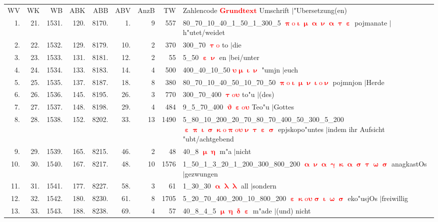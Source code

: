 \documentclass[a4paper,10pt,landscape]{article}
\begin{document}
\begin{tabular}{rrrrrrrrp{120mm}}
WV&WK&WB&ABK&ABB&ABV&AnzB&TW&Zahlencode \textcolor{red}{$\boldsymbol{Grundtext}$} Umschrift $|$"Ubersetzung(en)\\
1.&21.&1531.&120.&8170.&1.&9&557&80\_70\_10\_40\_1\_50\_1\_300\_5 \textcolor{red}{$\boldsymbol{\uppi\mathrm{o}\upiota\upmu\upalpha\upnu\upalpha\uptau\upepsilon}$} pojmanate $|$h"utet/weidet\\
2.&22.&1532.&129.&8179.&10.&2&370&300\_70 \textcolor{red}{$\boldsymbol{\uptau\mathrm{o}}$} to $|$die\\
3.&23.&1533.&131.&8181.&12.&2&55&5\_50 \textcolor{red}{$\boldsymbol{\upepsilon\upnu}$} en $|$bei/unter\\
4.&24.&1534.&133.&8183.&14.&4&500&400\_40\_10\_50 \textcolor{red}{$\boldsymbol{\upsilon\upmu\upiota\upnu}$} "umjn $|$euch\\
5.&25.&1535.&137.&8187.&18.&8&380&80\_70\_10\_40\_50\_10\_70\_50 \textcolor{red}{$\boldsymbol{\uppi\mathrm{o}\upiota\upmu\upnu\upiota\mathrm{o}\upnu}$} pojmnjon $|$Herde\\
6.&26.&1536.&145.&8195.&26.&3&770&300\_70\_400 \textcolor{red}{$\boldsymbol{\uptau\mathrm{o}\upsilon}$} to"u $|$(des)\\
7.&27.&1537.&148.&8198.&29.&4&484&9\_5\_70\_400 \textcolor{red}{$\boldsymbol{\upvartheta\upepsilon\mathrm{o}\upsilon}$} Teo"u $|$Gottes\\
8.&28.&1538.&152.&8202.&33.&13&1490&5\_80\_10\_200\_20\_70\_80\_70\_400\_50\_300\_5\_200 \textcolor{red}{$\boldsymbol{\upepsilon\uppi\upiota\upsigma\upkappa\mathrm{o}\uppi\mathrm{o}\upsilon\upnu\uptau\upepsilon\upsigma}$} epjskopo"untes $|$indem ihr Aufsicht "ubt/achtgebend\\
9.&29.&1539.&165.&8215.&46.&2&48&40\_8 \textcolor{red}{$\boldsymbol{\upmu\upeta}$} m"a $|$nicht\\
10.&30.&1540.&167.&8217.&48.&10&1576&1\_50\_1\_3\_20\_1\_200\_300\_800\_200 \textcolor{red}{$\boldsymbol{\upalpha\upnu\upalpha\upgamma\upkappa\upalpha\upsigma\uptau\upomega\upsigma}$} anagkastOs $|$gezwungen\\
11.&31.&1541.&177.&8227.&58.&3&61&1\_30\_30 \textcolor{red}{$\boldsymbol{\upalpha\uplambda\uplambda}$} all $|$sondern\\
12.&32.&1542.&180.&8230.&61.&8&1705&5\_20\_70\_400\_200\_10\_800\_200 \textcolor{red}{$\boldsymbol{\upepsilon\upkappa\mathrm{o}\upsilon\upsigma\upiota\upomega\upsigma}$} eko"usjOs $|$freiwillig\\
13.&33.&1543.&188.&8238.&69.&4&57&40\_8\_4\_5 \textcolor{red}{$\boldsymbol{\upmu\upeta\updelta\upepsilon}$} m"ade $|$(und) nicht\\

\end{tabular}
\end{document}
